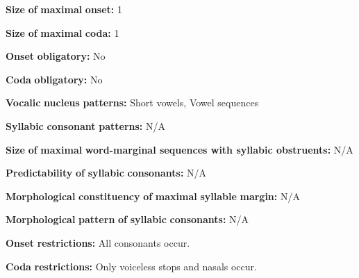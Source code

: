 \documentclass[output=paper]{langsci/langscibook}
\begin{document}
\begin{styleBody}
\textbf{Size} \textbf{of} \textbf{maximal} \textbf{onset:} 1
\end{styleBody}

\begin{styleBody}
\textbf{Size} \textbf{of} \textbf{maximal} \textbf{coda:} 1
\end{styleBody}

\begin{styleBody}
\textbf{Onset} \textbf{obligatory:} No
\end{styleBody}

\begin{styleBody}
\textbf{Coda} \textbf{obligatory:} No
\end{styleBody}

\begin{styleBody}
\textbf{Vocalic} \textbf{nucleus} \textbf{patterns:} Short vowels, Vowel sequences
\end{styleBody}

\begin{styleBody}
\textbf{Syllabic} \textbf{consonant} \textbf{patterns:} N/A
\end{styleBody}

\begin{styleBody}
\textbf{Size} \textbf{of} \textbf{maximal} \textbf{word{}-marginal sequences with syllabic obstruents:} N/A
\end{styleBody}

\begin{styleBody}
\textbf{Predictability} \textbf{of} \textbf{syllabic} \textbf{consonants:} N/A
\end{styleBody}

\begin{styleBody}
\textbf{Morphological} \textbf{constituency} \textbf{of} \textbf{maximal} \textbf{syllable} \textbf{margin:} N/A
\end{styleBody}

\begin{styleBody}
\textbf{Morphological} \textbf{pattern} \textbf{of} \textbf{syllabic} \textbf{consonants:} N/A
\end{styleBody}

\begin{styleBody}
\textbf{Onset} \textbf{restrictions:} All consonants occur.
\end{styleBody}

\begin{styleBody}
\textbf{Coda} \textbf{restrictions:} Only voiceless stops and nasals occur.
\end{styleBody}
\end{document}
